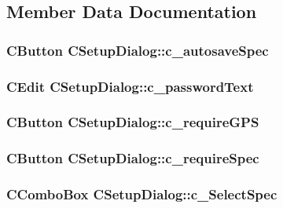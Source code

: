 \subsection{Member Data Documentation}
\hypertarget{classCSetupDialog_a789c028127b67f50c7cf7cd244128fd4}{
\subsubsection[{c\_\-autosaveSpec}]{\setlength{\rightskip}{0pt plus 5cm}CButton {\bf CSetupDialog::c\_\-autosaveSpec}}}
\label{classCSetupDialog_a789c028127b67f50c7cf7cd244128fd4}
\hypertarget{classCSetupDialog_aba904d5349c9a004c61bdf91418615dc}{
\subsubsection[{c\_\-passwordText}]{\setlength{\rightskip}{0pt plus 5cm}CEdit {\bf CSetupDialog::c\_\-passwordText}}}
\label{classCSetupDialog_aba904d5349c9a004c61bdf91418615dc}
\hypertarget{classCSetupDialog_afdf50f7162cb151b4c2841f4fc9cb8c8}{
\subsubsection[{c\_\-requireGPS}]{\setlength{\rightskip}{0pt plus 5cm}CButton {\bf CSetupDialog::c\_\-requireGPS}}}
\label{classCSetupDialog_afdf50f7162cb151b4c2841f4fc9cb8c8}
\hypertarget{classCSetupDialog_ab7c5adbfcb68c03fe442d16512b3576a}{
\subsubsection[{c\_\-requireSpec}]{\setlength{\rightskip}{0pt plus 5cm}CButton {\bf CSetupDialog::c\_\-requireSpec}}}
\label{classCSetupDialog_ab7c5adbfcb68c03fe442d16512b3576a}
\hypertarget{classCSetupDialog_a0a66e6d51d04b9a568b2c78d10161b30}{
\subsubsection[{c\_\-SelectSpec}]{\setlength{\rightskip}{0pt plus 5cm}CComboBox {\bf CSetupDialog::c\_\-SelectSpec}}}

